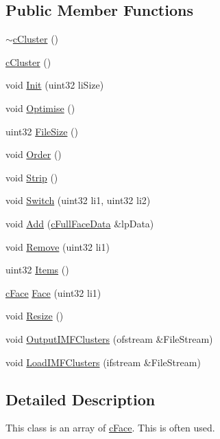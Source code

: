 \subsection*{Public Member Functions}
\begin{DoxyCompactItemize}
\item 
\hyperlink{classc_cluster_a3619dea229d3ba27971e269da3b378ae}{$\sim$cCluster} ()
\item 
\hyperlink{classc_cluster_ab74ec08068af60493977ad34c5574c06}{cCluster} ()
\item 
void \hyperlink{classc_cluster_a50ea40648d8dcd58e3a6efeac29d248c}{Init} (uint32 liSize)
\item 
void \hyperlink{classc_cluster_afd4809ebe068176d59baabd068ba217b}{Optimise} ()
\item 
uint32 \hyperlink{classc_cluster_a6e326c98acf18747df2cfeebf79747fc}{FileSize} ()
\item 
void \hyperlink{classc_cluster_a92fc1be6bfad8a7389fc6f3307080080}{Order} ()
\item 
void \hyperlink{classc_cluster_ac3cd20b4c2639fb7b7eb1d91941ad3dd}{Strip} ()
\item 
void \hyperlink{classc_cluster_a6d520713715a5971e5d9dca52ee2d4b6}{Switch} (uint32 li1, uint32 li2)
\item 
void \hyperlink{classc_cluster_a18406f95cb8ae040c5db49c6ca213e59}{Add} (\hyperlink{classc_full_face_data}{cFullFaceData} \&lpData)
\item 
void \hyperlink{classc_cluster_afe2dbd58852ed9884fef815fb623d949}{Remove} (uint32 li1)
\item 
uint32 \hyperlink{classc_cluster_a839fcbeea273b74074f24b818113e84e}{Items} ()
\item 
\hyperlink{classc_face}{cFace} \hyperlink{classc_cluster_ac69ada115a3ad8d775c94030f3971f45}{Face} (uint32 li1)
\item 
void \hyperlink{classc_cluster_aa52dd680312de3a5b88e46482c2403e3}{Resize} ()
\item 
void \hyperlink{classc_cluster_a16e894ebf06649cb8cc893378633ba18}{OutputIMFClusters} (ofstream \&FileStream)
\item 
void \hyperlink{classc_cluster_a47b962cf7ec206fa73e30122929d425b}{LoadIMFClusters} (ifstream \&FileStream)
\end{DoxyCompactItemize}


\subsection{Detailed Description}
This class is an array of \hyperlink{classc_face}{cFace}. This is often used. 

